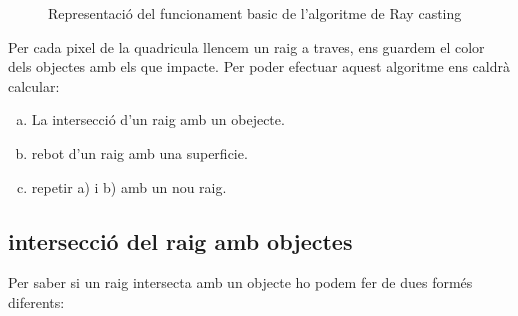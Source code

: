 \documentclass{article}
\begin{document}
\begin{figure}
   
\caption{Representació del funcionament basic de l'algoritme de Ray casting}
\end{figure}



Per cada pixel de la quadricula llencem un raig a traves, ens guardem el color dels objectes amb els que impacte.
Per poder efectuar aquest algoritme ens caldrà calcular:
  \begin{enumerate}[a)]
     \item La intersecció d'un raig amb un obejecte.
     \item rebot d'un raig amb una superficie.
     \item  repetir a) i b) amb un nou raig.
  \end{enumerate} 
\subsection{intersecció del raig amb objectes}
Per saber si un raig intersecta amb un objecte ho podem fer de dues formés diferents:
\end{document}
